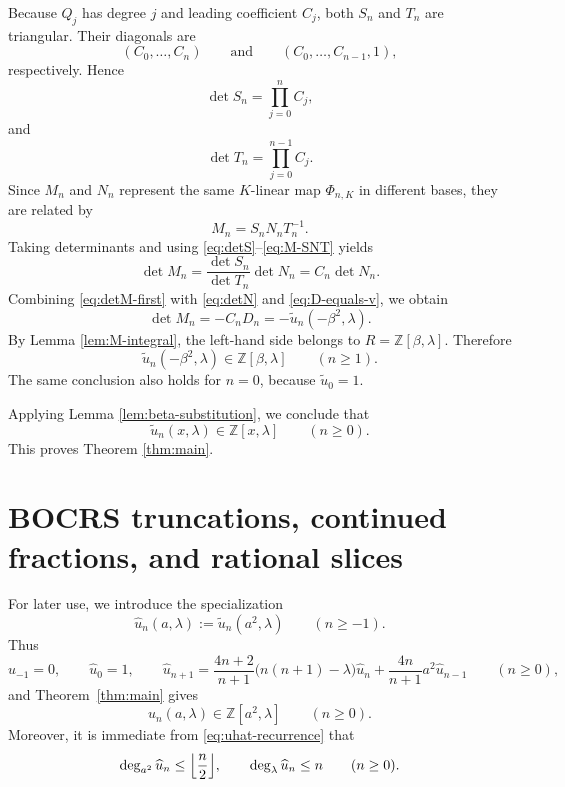 \documentclass[11pt,letterpaper]{amsart}
\numberwithin{equation}{section}
\theoremstyle{plain}
\theoremstyle{remark}
\newcommand{\Z}{\mathbb{Z}}
\begin{document}
Because \(Q_j\) has degree \(j\) and leading coefficient \(C_j\), both \(S_n\) and \(T_n\)
are triangular. Their diagonals are
\[
(C_0,\dots,C_n)
\qquad\text{and}\qquad
(C_0,\dots,C_{n-1},1),
\]
respectively. Hence
\begin{equation}\label{eq:detS}
 \det S_n=\prod_{j=0}^n C_j,
\end{equation}
and
\begin{equation}\label{eq:detT}
 \det T_n=\prod_{j=0}^{n-1} C_j.
\end{equation}
Since $M_n$ and $N_n$ represent the same $K$-linear map $\Phi_{n,K}$ in different bases, they are related by
\begin{equation}\label{eq:M-SNT}
 M_n=S_nN_nT_n^{-1}.
\end{equation}
Taking determinants and using \eqref{eq:detS}--\eqref{eq:M-SNT} yields
\begin{equation}\label{eq:detM-first}
 \det M_n=\frac{\det S_n}{\det T_n}\det N_n=C_n\det N_n.
\end{equation}
Combining \eqref{eq:detM-first} with \eqref{eq:detN} and \eqref{eq:D-equals-v}, we obtain
\begin{equation}\label{eq:detM-final}
 \det M_n=-C_nD_n=-\widetilde u_n(-\beta^2,\lambda).
\end{equation}
By Lemma \ref{lem:M-integral}, the left-hand side belongs to $R=\Z[\beta,\lambda]$. Therefore
\[
 \widetilde u_n(-\beta^2,\lambda)\in \Z[\beta,\lambda]
 \qquad(n\ge 1).
\]
The same conclusion also holds for $n=0$, because $\widetilde u_0=1$.

Applying Lemma \ref{lem:beta-substitution}, we conclude that
\[
 \widetilde u_n(x,\lambda)\in \Z[x,\lambda]
 \qquad(n\ge 0).
\]
This proves Theorem \ref{thm:main}.

\section{BOCRS truncations, continued fractions, and rational slices}
\label{sec:continued-fractions}

For later use, we introduce the specialization
\[
\widehat u_n(a,\lambda):=\widetilde u_n(a^2,\lambda)
\qquad(n\ge -1).
\]
Thus
\begin{equation}\label{eq:uhat-recurrence}
\widehat u_{-1}=0,
\qquad
\widehat u_0=1,
\qquad
\widehat u_{n+1}
=
\frac{4n+2}{n+1}\bigl(n(n+1)-\lambda\bigr)\widehat u_n
+\frac{4n}{n+1}a^2\widehat u_{n-1}
\qquad(n\ge 0),
\end{equation}
and Theorem~\ref{thm:main} gives
\begin{equation}\label{eq:uhat-integrality}
\widehat u_n(a,\lambda)\in \Z[a^2,\lambda]
\qquad(n\ge 0).
\end{equation}
Moreover, it is immediate from \eqref{eq:uhat-recurrence} that
\begin{equation}\label{eq:uhat-degree-bounds}
\deg_{a^2}\widehat u_n\le \Bigl\lfloor\frac{n}{2}\Bigr\rfloor,
\qquad
\deg_{\lambda}\widehat u_n\le n
\qquad(n\ge 0).
\end{equation}
\end{document}
